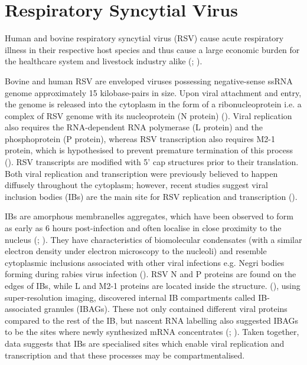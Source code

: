 \section{Respiratory Syncytial Virus} \label{sec:Respiratory Syncytial Virus}
Human and bovine respiratory syncytial virus (RSV) cause acute respiratory illness in their respective host species and thus cause a large economic burden for the healthcare system and livestock industry alike (\cite{Jha2016RespiratoryVirus}; \cite{Sacco2014RespiratoryCattle}). 

Bovine and human RSV are enveloped viruses possessing negative-sense ssRNA genome approximately 15 kilobase-pairs in size. Upon viral attachment and entry, the genome is released into the cytoplasm in the form of a ribonucleoprotein i.e. a complex of RSV genome with its nucleoprotein (N protein) (\cite{Noton2015InitiationReplication}). Viral replication also requires the RNA-dependent RNA polymerase (L protein) and the phosphoprotein (P protein), whereas RSV transcription also requires M2-1 protein, which is hypothesised to prevent premature termination of this process (\cite{Tanner2014CrystalPhosphorylation}). RSV transcripts are modified with 5’ cap structures prior to their translation. Both viral replication and transcription were previously believed to happen diffusely throughout the cytoplasm; however, recent studies suggest viral inclusion bodies (IBs) are the main site for RSV replication and transcription (\cite{Rincheval2017FunctionalVirus}). 

IBs are amorphous membranelles aggregates, which have been observed to form as early as 6 hours post-infection and often localise in close proximity to the nucleus (\cite{Bachi1973MorphogenesisVirus}; \cite{Jobe2020RespiratorySignaling}). They have characteristics of biomolecular condensates (with a similar electron density under electron microscopy to the nucleoli) and resemble cytoplasmic inclusions associated with other viral infections e.g. Negri bodies forming during rabies virus infection (\cite{Nikolic2017NegriOrganelles}). RSV N and P proteins are found on the edges of IBs, while L and M2-1 proteins are located inside the structure. (\cite{Rincheval2017FunctionalVirus}), using super-resolution imaging, discovered internal IB compartments called IB-associated granules (IBAGs). These not only contained different viral proteins compared to the rest of the IB, but nascent RNA labelling also suggested IBAGs to be the sites where newly synthesized mRNA concentrates (\cite{Jobe2020RespiratorySignaling}; \cite{Richard2018RSVTranscription}). Taken together, data suggests that IBs are specialised sites which enable viral replication and transcription and that these processes may be compartmentalised.

